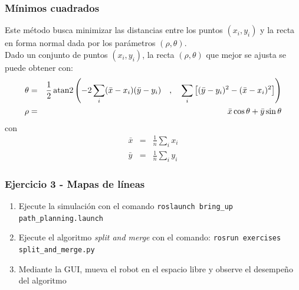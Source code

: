 \begin{frame}\frametitle{Mínimos cuadrados}
  Este método busca minimizar las distancias entre los puntos $(x_i,y_i)$ y la recta en forma normal dada por los parámetros $(\rho, \theta)$.
  \[\]
  Dado un conjunto de puntos $(x_i, y_i)$, la recta $(\rho,\theta)$ que mejor se ajusta se puede obtener con:
  \begin{eqnarray*}
    \theta &=& \frac{1}{2}\operatorname{atan2}\left(-2\sum_i (\bar{x} - x_i)(\bar{y}-y_i)\quad,\quad \sum_i\left[(\bar{y} - y_i)^2 - (\bar{x} - x_i)^2\right]\right)\\
    \rho &=& \bar{x}\cos\theta + \bar{y}\sin\theta
  \end{eqnarray*}
  con
  \begin{eqnarray*}
    \bar{x} &=& \frac{1}{n}\sum_i x_i\\
    \bar{y} &=& \frac{1}{n}\sum_i y_i
  \end{eqnarray*}
\end{frame}

\begin{frame}[containsverbatim]\frametitle{Ejercicio 3 - Mapas de líneas}
  \begin{enumerate}
  \item Ejecute la simulación con el comando \texttt{roslaunch bring\_up path\_planning.launch}
  \item Ejecute el algoritmo \textit{split and merge} con el comando: \texttt{rosrun exercises split\_and\_merge.py}
  \item Mediante la GUI, mueva el robot en el espacio libre y observe el desempeño del algoritmo
  \end{enumerate}
\end{frame}


